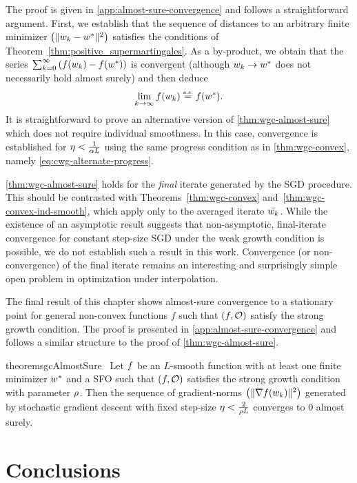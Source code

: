 The proof is given in \autoref{app:almost-sure-convergence} and follows a straightforward argument.
First, we establish that the sequence of distances to an arbitrary finite minimizer \( \seq{\norm{\wk - \wopt}^2} \) satisfies the conditions of Theorem~\ref{thm:positive_supermartingales}.
As a by-product, we obtain that the series \( \sum_{k=0}^{\infty} \rbr{f(\wk) - f(\wopt)} \) is convergent (although \( \wk \rightarrow \wopt \) does not necessarily hold almost surely) and then deduce
\[ \lim_{k\rightarrow\infty} f(\wk) \equas f(\wopt). \] 
It is straightforward to prove an alternative version of \autoref{thm:wgc-almost-sure} which does not require individual smoothness.
In this case, convergence is established for \( \eta < \frac{1}{\wgc L} \) using the same progress condition as in \autoref{thm:wgc-convex}, namely \autoref{eq:cwg-alternate-progress}.

\autoref{thm:wgc-almost-sure} holds for the \emph{final} iterate generated by the \ac{SGD} procedure.
This should be contrasted with Theorems~\ref{thm:wgc-convex} and~\ref{thm:wgc-convex-ind-smooth}, which apply only to the averaged iterate \( \bar \wk \).
While the existence of an asymptotic result suggests that non-asymptotic, final-iterate convergence for constant step-size \ac{SGD} under the weak growth condition is possible, we do not establish such a result in this work. 
Convergence (or non-convergence) of the final iterate remains an interesting and surprisingly simple open problem in optimization under interpolation.

The final result of this chapter shows almost-sure convergence to a stationary point for general non-convex functions \( f \) such that \( \rbr{f, \oracle{}} \) satisfy the strong growth condition.
The proof is presented in \autoref{app:almost-sure-convergence} and follows a similar structure to the proof of \autoref{thm:wgc-almost-sure}.

\begin{restatable}{theorem}{sgcAlmostSure}~\label{thm:sgc-almost-sure}
    Let \( \f \) be an \( L \)-smooth function with at least one finite minimizer \( \wopt \) and \oracle{} a SFO such that \( \rbr{f, \oracle{}} \) satisfies the strong growth condition with parameter \( \sgc \).
    Then the sequence of gradient-norms \( \seq{\norm{\grad(\wk)}^2} \) generated by stochastic gradient descent with fixed step-size \(\eta < \frac{2}{\sgc L} \) converges to \( 0 \) almost surely.
\end{restatable}

\section{Conclusions}~\label{sec:sgd-conclusions}

